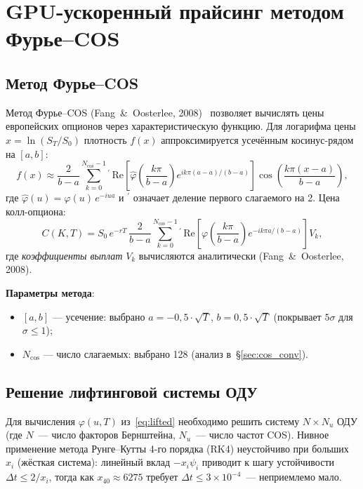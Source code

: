
\section{GPU-ускоренный прайсинг методом Фурье–COS}
\label{sec:pricing}

\subsection{Метод Фурье–COS}

Метод Фурье--COS (Fang~\&~Oosterlee, 2008)~\cite{Fang2008} позволяет
вычислять цены европейских опционов через характеристическую функцию.
Для логарифма цены $x = \ln(S_T/S_0)$ плотность $f(x)$ аппроксимируется
усечённым косинус-рядом на $[a, b]$:
\[
  f(x) \approx \frac{2}{b-a}\sum_{k=0}^{N_{\mathrm{cos}}-1}{}^{\prime}
  \,\mathrm{Re}\!\left[\hat\varphi\!\left(\frac{k\pi}{b-a}\right)
  e^{ik\pi(a-a)/(b-a)}\right]\cos\!\left(\frac{k\pi(x-a)}{b-a}\right),
\]
где $\hat\varphi(u) = \varphi(u)\,e^{-iua}$ и ${}^{\prime}$ означает
деление первого слагаемого на 2. Цена колл-опциона:
\begin{equation}
  \label{eq:cos_price}
  C(K, T) = S_0\,e^{-rT}\,\frac{2}{b-a}\sum_{k=0}^{N_{\mathrm{cos}}-1}{}^{\prime}
  \,\mathrm{Re}\!\left[\varphi\!\left(\frac{k\pi}{b-a}\right)
  e^{-ik\pi a/(b-a)}\right] V_k,
\end{equation}
где \textit{коэффициенты выплат} $V_k$ вычисляются аналитически
(Fang~\&~Oosterlee, 2008).

\textbf{Параметры метода}:
\begin{itemize}
  \item $[a, b]$ --- усечение: выбрано $a = -0{,}5 \cdot \sqrt{T}$,
        $b = 0{,}5 \cdot \sqrt{T}$ (покрывает $5\sigma$ для $\sigma\leq 1$);
  \item $N_{\mathrm{cos}}$ --- число слагаемых: выбрано 128 (анализ в~§\ref{sec:cos_conv}).
\end{itemize}

\subsection{Решение лифтинговой системы ОДУ}

Для вычисления $\varphi(u,T)$ из~\eqref{eq:lifted} необходимо решить систему
$N\times N_u$ ОДУ (где $N$~--- число факторов Бернштейна, $N_u$~--- число
частот COS). Нивное применение метода Рунге--Кутты 4-го порядка (RK4) неустойчиво
при больших $x_i$ (жёсткая система): линейный вклад $-x_i\psi_i$ приводит
к шагу устойчивости $\Delta t \leq 2/x_i$, тогда как $x_{40} \approx 6275$
требует $\Delta t \leq 3\times 10^{-4}$~--- неприемлемо мало.

